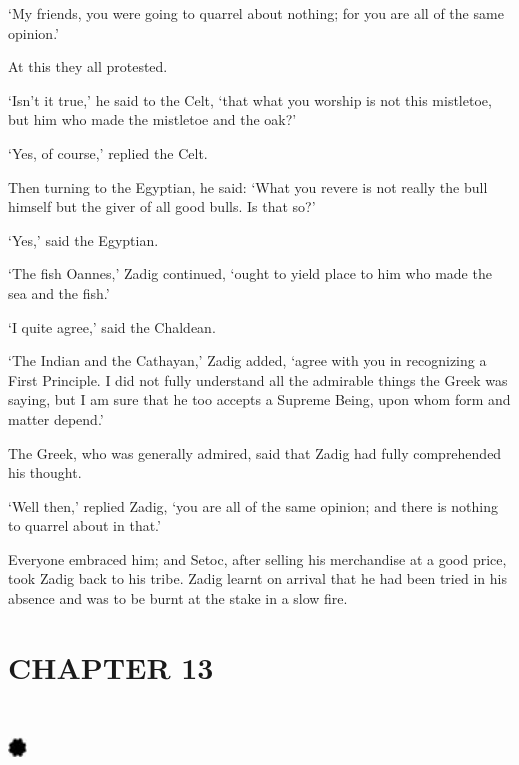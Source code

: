 \documentclass{article}
\begin{document}
\begin{center}
`My friends, you were going to quarrel about nothing; for you are all of the same 
opinion.' 

At this they all protested. 

`Isn't it true,' he said to the Celt, `that what you worship is not this mistletoe, 
but him who made the mistletoe and the oak?' 

`Yes, of course,' replied the Celt. 

Then turning to the Egyptian, he said: `What you revere is not really the bull 
himself but the giver of all good bulls. Is that so?' 

`Yes,' said the Egyptian. 

`The fish Oannes,' Zadig continued, `ought to yield place to him who made the sea 
and the fish.' 

`I quite agree,' said the Chaldean. 

`The Indian and the Cathayan,' Zadig added, `agree with you in recognizing a First 
Principle. I did not fully understand all the admirable things the Greek was saying, 
but I am sure that he too accepts a Supreme Being, upon whom form and matter depend.' 

The Greek, who was generally admired, said that Zadig had fully comprehended his 
thought. 

`Well then,' replied Zadig, `you are all of the same opinion; and there is nothing 
to quarrel about in that.' 

Everyone embraced him; and Setoc, after selling his merchandise at a good price, 
took Zadig back to his tribe. Zadig learnt on arrival that he had been tried in 
his absence and was to be burnt at the stake in a slow fire.\pagebreak{} 

\section*{\textbf{CHAPTER 13  }}

\section*{%
\includegraphics[width=14pt, height=15pt, keepaspectratio=true]{Zadig or L'Ingenu - Voltaire-fig016.jpg}
}


\end{center}
\end{document}
